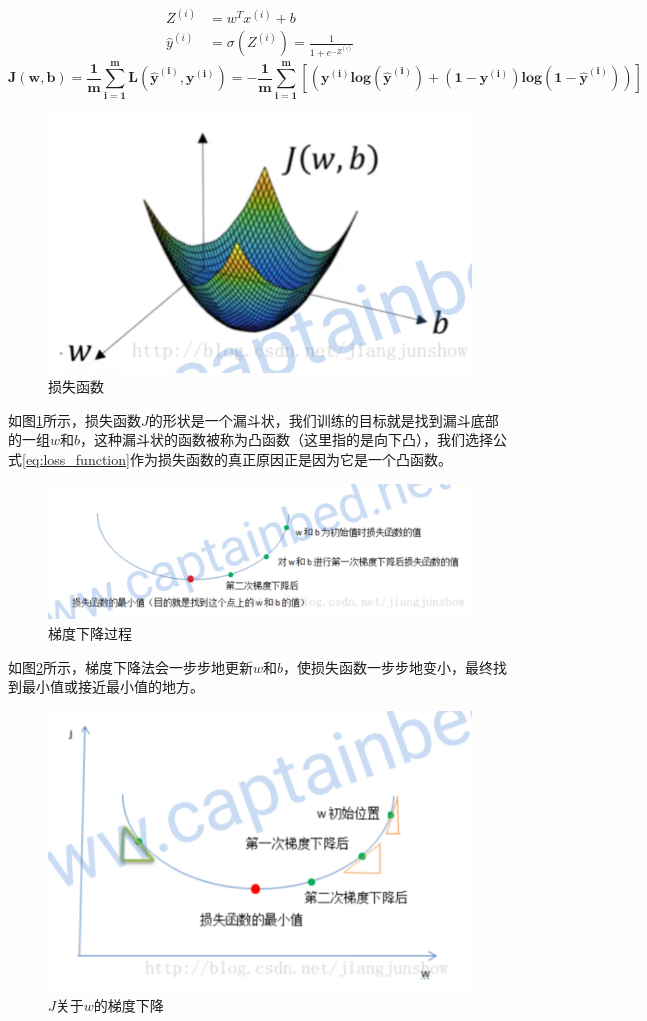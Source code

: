 \begin{align*}
Z^{(i)} &= w^Tx^{(i)} + b \\
\hat{y}^{(i)} &= \sigma (Z^{(i)}) = \frac{1}{1 + e^{-Z^{(i)}}}
\end{align*}
 $$
\bm{J(w,b) = \frac{1}{m}\sum_{i=1}^{m}L(\hat{y}^{(i)}, y^{(i)}) = - \frac{1}{m}\sum_{i=1}^{m}[(y^{(i)}log(\hat{y}^{(i)}) + (1 - y^{(i)})log(1 - \hat{y}^{(i)}))]}
$$

\begin{figure}[htb]
	\centering
	\includegraphics[width=0.7\linewidth]{pictures/成本/lost}
	\caption{损失函数}
	\label{fig:lost}
\end{figure}

如图\ref{fig:lost}所示，损失函数$J$的形状是一个漏斗状，我们训练的目标就是找到漏斗底部的一组$w$和$b$，这种漏斗状的函数被称为凸函数（这里指的是向下凸），我们选择公式\ref{eq:loss_function}作为损失函数的真正原因正是因为它是一个凸函数。

\begin{figure}[htb]
	\centering
	\includegraphics[width=0.7\linewidth]{pictures/梯度下降法/gradient_descent1}
	\caption{梯度下降过程}
	\label{fig:gradient_descent1}
\end{figure}

如图\ref{fig:gradient_descent1}所示，梯度下降法会一步步地更新$w$和$b$，使损失函数一步步地变小，最终找到最小值或接近最小值的地方。
\begin{figure}[htb]
	\centering
	\includegraphics[width=0.7\linewidth]{pictures/梯度下降法/gradient_descent2}
	\caption{$J$关于$w$的梯度下降}
	\label{fig:gradient_descent2}
\end{figure}


